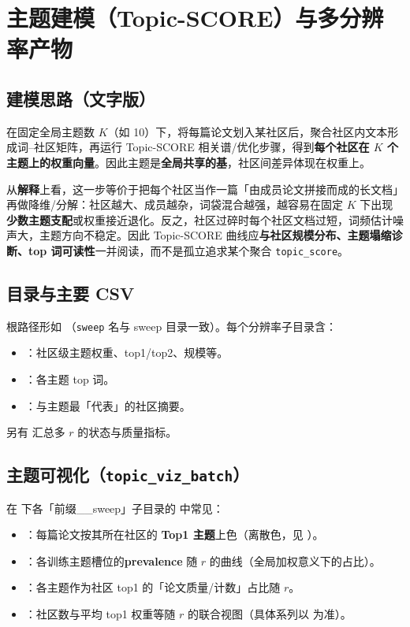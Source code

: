 \documentclass[UTF8,a4paper,11pt,fontset=fandol]{ctexart}
\begin{document}
\section{主题建模（Topic-SCORE）与多分辨率产物}

\subsection{建模思路（文字版）}
在固定全局主题数 $K$（如 10）下，将每篇论文划入某社区后，聚合社区内文本形成词--社区矩阵，再运行 Topic-SCORE 相关谱/优化步骤，得到\textbf{每个社区在 $K$ 个主题上的权重向量}。因此主题是\textbf{全局共享的基}，社区间差异体现在权重上。

从\textbf{解释}上看，这一步等价于把每个社区当作一篇「由成员论文拼接而成的长文档」再做降维/分解：社区越大、成员越杂，词袋混合越强，越容易在固定 $K$ 下出现\textbf{少数主题支配}或权重接近退化。反之，社区过碎时每个社区文档过短，词频估计噪声大，主题方向不稳定。因此 Topic-SCORE 曲线应\textbf{与社区规模分布、主题塌缩诊断、top 词可读性}一并阅读，而不是孤立追求某个聚合 \texttt{topic\_score}。

\subsection{目录与主要 CSV}
根路径形如 （\texttt{sweep} 名与 sweep 目录一致）。每个分辨率子目录含：
\begin{itemize}
  \item {}：社区级主题权重、top1/top2、规模等。
  \item {}：各主题 top 词。
  \item {}：与主题最「代表」的社区摘要。
\end{itemize}
另有  汇总多 $r$ 的状态与质量指标。

\subsection{主题可视化（\texttt{topic\_viz\_batch}）}
在  下各「前缀\_\_sweep」子目录的  中常见：
\begin{itemize}
  \item {}：每篇论文按其所在社区的 \textbf{Top1 主题}上色（离散色，见 ）。
  \item {}：各训练主题槽位的\textbf{prevalence} 随 $r$ 的曲线（全局加权意义下的占比）。
  \item {}：各主题作为社区 top1 的「论文质量/计数」占比随 $r$。
  \item {}：社区数与平均 top1 权重等随 $r$ 的联合视图（具体系列以  为准）。
\end{itemize}
\end{document}
